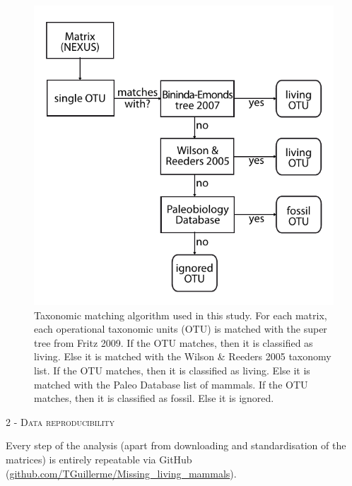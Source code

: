 \documentclass[12pt,letterpaper]{article}
\renewcommand{\section}[1]{%
\bigskip
\begin{center}
\begin{Large}
\normalfont\scshape #1
\medskip
\end{Large}
\end{center}}
\begin{document}
\begin{figure}[!htbp]
\centering
    \includegraphics[width=1\textwidth]{Supp_figure_Taxonomic_algorithm.pdf}
\caption{Taxonomic matching algorithm used in this study. For each matrix, each operational taxonomic units (OTU) is matched with the super tree from Fritz 2009. If the OTU matches, then it is classified as living. Else it is matched with the Wilson \& Reeders 2005 taxonomy list. If the OTU matches, then it is classified as living. Else it is matched with the Paleo Database list of mammals. If the OTU matches, then it is classified as fossil. Else it is ignored.}
\label{Supp_figure_Taxonomic_algorithm}
\end{figure}

\section{2 - Data reproducibility}
Every step of the analysis (apart from downloading and standardisation of the matrices) is entirely repeatable via GitHub (\url{github.com/TGuillerme/Missing_living_mammals}).



\end{document}
